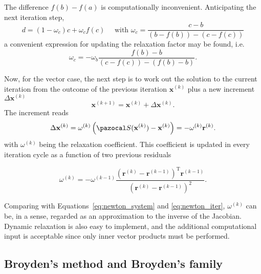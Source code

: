 The difference \(f(b)-f(a)\) is computationally inconvenient.
Anticipating the next iteration step,
\begin{equation}
d=\left(1-\omega_{c}\right) c+\omega_{c} f(c) \quad \text { with } \omega_{c}=\frac{c-b}{\left(b-f(b)\right)-\left(c-f(c)\right)}
\end{equation}
a convenient expression for updating the relaxation factor may be found, i.e.
\begin{equation}
\omega_{c}=-\omega_{b}\frac{f(b)-b}{(c-f(c))-(f(b)-b)}.
\end{equation}

Now, for the vector case, the next step is to work out the solution to the current iteration from the outcome of the previous iteration $\mathbf{x}^{(k)}$ plus a new increment $\Delta \mathbf{x}^{(k)}$
\begin{equation}
\mathbf{x}^{(k+1)}=\mathbf{x}^{(k)}+\Delta \mathbf{x}^{(k)}.
\end{equation}
The increment reads
\begin{equation}
\Delta \mathbf{x}^{(k)}=\omega^{(k)}\left(\pazocal S(\mathbf{x}^{(k)})-\mathbf{x}^{(k)}\right)=-\omega^{(k)} \mathbf r^{(k)}.
\end{equation}
with $\omega^{(k)}$ being the relaxation coefficient.
This coefficient is updated in every iteration cycle as a function of two previous residuals
\begin{highlight}
  \begin{equation}
    \omega^{(k)}=-\omega^{(k-1)} \frac{\left(\mathbf{r}^{(k)}-\mathbf{r}^{(k-1)}\right)^{\mathrm{T}} \mathbf{r}^{(k-1)}}{\left(\mathbf{r}^{(k)}-\mathbf{r}^{(k-1)}\right)^{2}}.
  \end{equation}
\end{highlight}
Comparing with Equations~\eqref{eq:newton_system} and \eqref{eq:newton_iter}, \(\omega^{(k)}\) can be, in a sense, regarded as an approximation to the inverse of the Jacobian.
Dynamic relaxation is also easy to implement, and the additional computational input is acceptable since only inner vector products must be performed.

\subsection{Broyden's method and Broyden's family}

